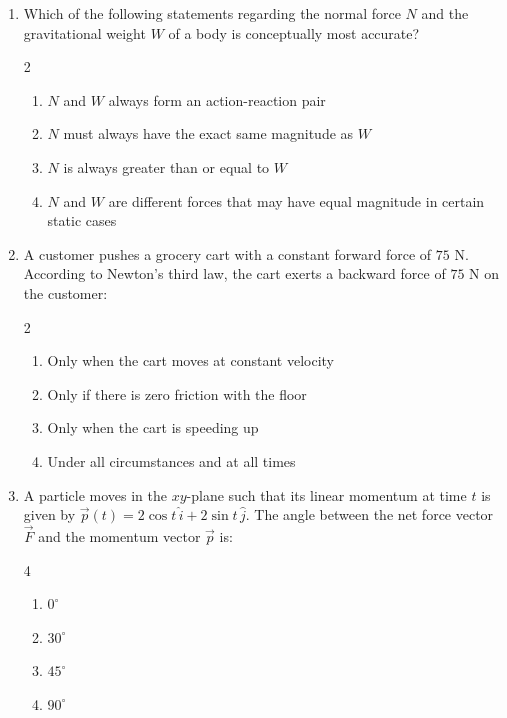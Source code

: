 \documentclass[11pt,a4paper]{article}
\begin{document}
\begin{enumerate}[label=\textbf{\arabic*.},leftmargin=18pt,itemsep=8pt]
  \item Which of the following statements regarding the normal force $N$ and the gravitational weight $W$ of a body is conceptually most accurate?
  \begin{multicols}{2}
    \begin{enumerate}[label=(\Alph*)]
      \item $N$ and $W$ always form an action-reaction pair
      \item $N$ must always have the exact same magnitude as $W$
      \item $N$ is always greater than or equal to $W$
      \item $N$ and $W$ are different forces that may have equal magnitude in certain static cases
    \end{enumerate}
  \end{multicols}

  \item A customer pushes a grocery cart with a constant forward force of $75\text{ N}$. According to Newton's third law, the cart exerts a backward force of $75\text{ N}$ on the customer:
  \begin{multicols}{2}
    \begin{enumerate}[label=(\Alph*)]
      \item Only when the cart moves at constant velocity
      \item Only if there is zero friction with the floor
      \item Only when the cart is speeding up
      \item Under all circumstances and at all times
    \end{enumerate}
  \end{multicols}

  \item A particle moves in the $xy$-plane such that its linear momentum at time $t$ is given by $\vec{p}(t) = 2\cos t\,\hat{i} + 2\sin t\,\hat{j}$. The angle between the net force vector $\vec{F}$ and the momentum vector $\vec{p}$ is:
  \begin{multicols}{4}
    \begin{enumerate}[label=(\Alph*)]
      \item $0^\circ$
      \item $30^\circ$
      \item $45^\circ$
      \item $90^\circ$
    \end{enumerate}
  \end{multicols}


\end{enumerate}
\end{document}
